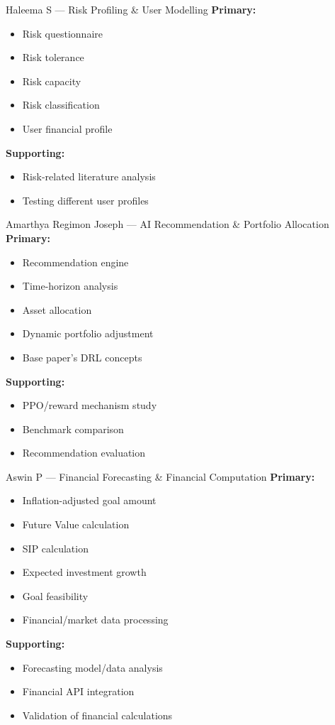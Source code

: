 \documentclass{beamer}
\begin{document}
\begin{frame}{Haleema S --- Risk Profiling \& User Modelling}
\small
\textbf{Primary:}
\begin{itemize}
    \item Risk questionnaire
    \item Risk tolerance
    \item Risk capacity
    \item Risk classification
    \item User financial profile
\end{itemize}
\textbf{Supporting:}
\begin{itemize}
    \item Risk-related literature analysis
    \item Testing different user profiles
\end{itemize}
\medskip
\end{frame}

\begin{frame}{Amarthya Regimon Joseph --- AI Recommendation \& Portfolio Allocation}
\small
\textbf{Primary:}
\begin{itemize}
    \item Recommendation engine
    \item Time-horizon analysis
    \item Asset allocation
    \item Dynamic portfolio adjustment
    \item Base paper's DRL concepts
\end{itemize}
\textbf{Supporting:}
\begin{itemize}
    \item PPO/reward mechanism study
    \item Benchmark comparison
    \item Recommendation evaluation
\end{itemize}
\medskip
\end{frame}

\begin{frame}{Aswin P --- Financial Forecasting \& Financial Computation}
\small
\textbf{Primary:}
\begin{itemize}
    \item Inflation-adjusted goal amount
    \item Future Value calculation
    \item SIP calculation
    \item Expected investment growth
    \item Goal feasibility
    \item Financial/market data processing
\end{itemize}
\textbf{Supporting:}
\begin{itemize}
    \item Forecasting model/data analysis
    \item Financial API integration
    \item Validation of financial calculations
\end{itemize}
\medskip
\end{frame}
\end{document}
